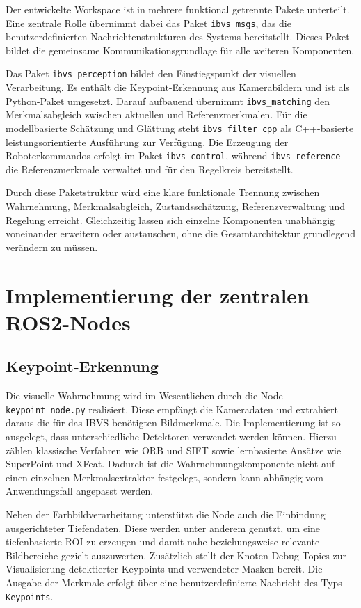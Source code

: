 Der entwickelte Workspace ist in mehrere funktional getrennte Pakete unterteilt. Eine zentrale Rolle übernimmt dabei das Paket \texttt{ibvs\_msgs}, das die benutzerdefinierten Nachrichtenstrukturen des Systems bereitstellt. Dieses Paket bildet die gemeinsame Kommunikationsgrundlage für alle weiteren Komponenten.

Das Paket \texttt{ibvs\_perception} bildet den Einstiegspunkt der visuellen Verarbeitung. Es enthält die Keypoint-Erkennung aus Kamerabildern und ist als Python-Paket umgesetzt. Darauf aufbauend übernimmt \texttt{ibvs\_matching} den Merkmalsabgleich zwischen aktuellen und Referenzmerkmalen. Für die modellbasierte Schätzung und Glättung steht \texttt{ibvs\_filter\_cpp} als C++-basierte leistungsorientierte Ausführung zur Verfügung. Die Erzeugung der Roboterkommandos erfolgt im Paket \texttt{ibvs\_control}, während \texttt{ibvs\_reference} die Referenzmerkmale verwaltet und für den Regelkreis bereitstellt.

Durch diese Paketstruktur wird eine klare funktionale Trennung zwischen Wahrnehmung, Merkmalsabgleich, Zustandsschätzung, Referenzverwaltung und Regelung erreicht. Gleichzeitig lassen sich einzelne Komponenten unabhängig voneinander erweitern oder austauschen, ohne die Gesamtarchitektur grundlegend verändern zu müssen.

\section{Implementierung der zentralen ROS2-Nodes}
\label{sec:implementierung_zentraler_ros2_knoten}

\subsection{Keypoint-Erkennung}
\label{sec:implementierung_keypoint_erkennung}

Die visuelle Wahrnehmung wird im Wesentlichen durch die Node \texttt{keypoint\_node.py} realisiert. Diese empfängt die Kameradaten und extrahiert daraus die für das \ac{IBVS} benötigten Bildmerkmale. Die Implementierung ist so ausgelegt, dass unterschiedliche Detektoren verwendet werden können. Hierzu zählen klassische Verfahren wie \ac{ORB} und \ac{SIFT} sowie lernbasierte Ansätze wie SuperPoint und XFeat. Dadurch ist die Wahrnehmungskomponente nicht auf einen einzelnen Merkmalsextraktor festgelegt, sondern kann abhängig vom Anwendungsfall angepasst werden.

Neben der Farbbildverarbeitung unterstützt die Node auch die Einbindung ausgerichteter Tiefendaten. Diese werden unter anderem genutzt, um eine tiefenbasierte \ac{ROI} zu erzeugen und damit nahe beziehungsweise relevante Bildbereiche gezielt auszuwerten. Zusätzlich stellt der Knoten Debug-Topics zur Visualisierung detektierter Keypoints und verwendeter Masken bereit. Die Ausgabe der Merkmale erfolgt über eine benutzerdefinierte Nachricht des Typs \texttt{Keypoints}. 

